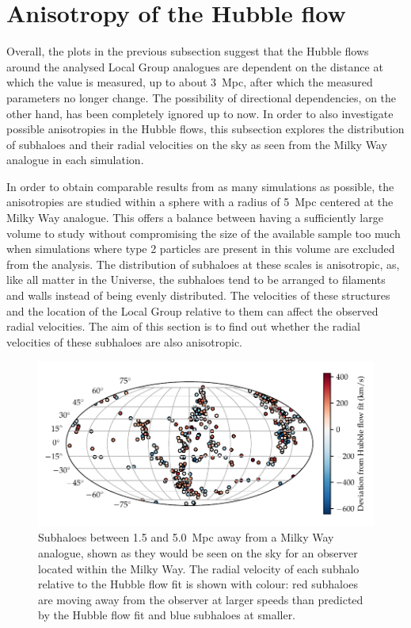 \documentclass[english, oneside]{HYgradu}
\begin{document}
\section{Anisotropy of the Hubble flow}
Overall, the plots in the previous subsection suggest that the Hubble flows around the analysed Local Group analogues are dependent on the distance at which the value is measured, up to about 3~Mpc, after which the measured parameters no longer change. The possibility of directional dependencies, on the other hand, has been completely ignored up to now. In order to also investigate possible anisotropies in the Hubble flows, this subsection explores the distribution of subhaloes and their radial velocities on the sky as seen from the Milky Way analogue in each simulation.

In order to obtain comparable results from as many simulations as possible, the anisotropies are studied within a sphere with a radius of 5~Mpc centered at the Milky Way analogue. This offers a balance between having a sufficiently large volume to study without compromising the size of the available sample too much when simulations where type 2 particles are present in this volume are excluded from the analysis. The distribution of subhaloes at these scales is anisotropic, as, like all matter in the Universe, the subhaloes tend to be arranged to filaments and walls instead of being evenly distributed. The velocities of these structures and the location of the Local Group relative to them can affect the observed radial velocities. The aim of this section is to find out whether the radial velocities of these subhaloes are also anisotropic. %

\begin{figure}
    \centering
    \includegraphics{kuvat/mollweide-anisotropy.pdf}
    \caption{Subhaloes between 1.5 and 5.0~Mpc away from a Milky Way analogue, shown as they would be seen on the sky for an observer located within the Milky Way.  The radial velocity of each subhalo relative to the Hubble flow fit is shown with colour: red subhaloes are moving away from the observer at larger speeds than predicted by the Hubble flow fit and blue subhaloes at smaller.}\label{fig:mollweide-anisotropy}
\end{figure}
\end{document}
